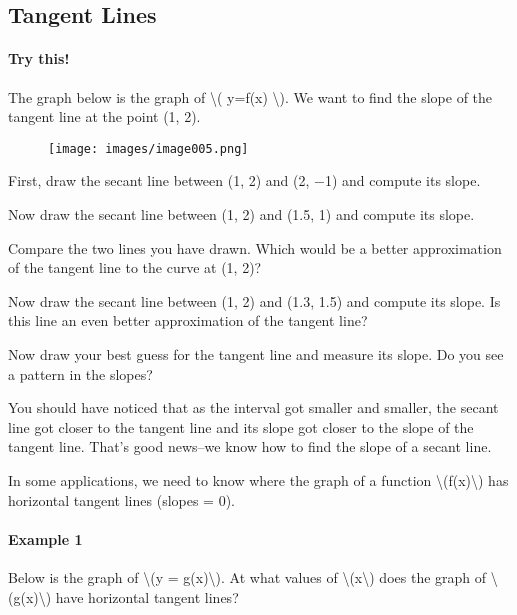 \hypertarget{tangent-lines}{%
\subsection{Tangent Lines}\label{tangent-lines}}

\hypertarget{try-this}{%
\paragraph{Try this!}\label{try-this}}

The graph below is the graph of \textbackslash{}( y=f(x)
\textbackslash{}). We want to find the slope of the tangent line at the
point (1, 2).

\begin{figure}
\centering
\texttt{[image: images/image005.png]}
\caption{}
\end{figure}

First, draw the secant line between (1, 2) and (2, −1) and compute its
slope.

Now draw the secant line between (1, 2) and (1.5, 1) and compute its
slope.

Compare the two lines you have drawn. Which would be a better
approximation of the tangent line to the curve at (1, 2)?

Now draw the secant line between (1, 2) and (1.3, 1.5) and compute its
slope. Is this line an even better approximation of the tangent line?

Now draw your best guess for the tangent line and measure its slope. Do
you see a pattern in the slopes?

You should have noticed that as the interval got smaller and smaller,
the secant line got closer to the tangent line and its slope got closer
to the slope of the tangent line. That's good news--we know how to find
the slope of a secant line.

In some applications, we need to know where the graph of a function
\textbackslash{}(f(x)\textbackslash{}) has horizontal tangent lines
(slopes = 0).

\hypertarget{example-1}{%
\paragraph{Example 1}\label{example-1}}

Below is the graph of \textbackslash{}(y = g(x)\textbackslash{}). At
what values of \textbackslash{}(x\textbackslash{}) does the graph of
\textbackslash{}(g(x)\textbackslash{}) have horizontal tangent lines?

